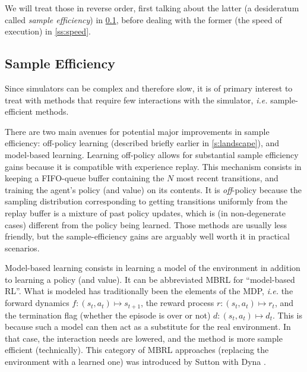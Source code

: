 \documentclass[12pt,a4paper]{article}
\begin{document}
We will treat those in reverse order, first talking
about the latter (a desideratum called \textit{sample efficiency}) in \ref{ss:efficiency},
before dealing with the former (the speed of execution) in \ref{ss:speed}.

\subsection{Sample Efficiency}
\label{ss:efficiency}

Since simulators can be complex and therefore slow,
it is of primary interest to treat with methods
that require few interactions with the simulator,
\textit{i.e.} sample-efficient methods.

There are two main avenues for potential major improvements in sample efficiency:
off-policy learning (described briefly earlier in \ref{s:landscape}),
and model-based learning.
Learning off-policy allows for substantial sample efficiency gains because it is compatible
with experience replay. This mechanism consists in keeping a FIFO-queue buffer containing the
$N$ most recent transitions, and training the agent's policy (and value) on its contents.
It is \textit{off}-policy because the sampling distribution corresponding to getting transitions
uniformly from the replay buffer is a mixture of past policy updates, which is (in non-degenerate
cases) different from the policy being learned. Those methods are usually less friendly, but the
sample-efficiency gains are arguably well worth it in practical scenarios.

Model-based learning consists in learning a model of the environment in addition to learning
a policy (and value). It can be abbreviated MBRL for ``model-based RL''. What is modeled has
traditionally been the elements of the MDP, \textit{i.e.}
the forward dynamics $f: (s_t, a_t) \mapsto s_{t+1}$,
the reward process $r: (s_t, a_t) \mapsto r_t$,
and the termination flag (whether the episode is over or not) $d: (s_t, a_t) \mapsto d_t$.
This is because such a model can then act as a substitute for the real environment.
In that case, the interaction needs are lowered, and the method is more sample efficient
(technically). This category of MBRL approaches (replacing the environment with a learned one)
was introduced by Sutton with Dyna \cite{Sutton1991-cp}.
\end{document}

